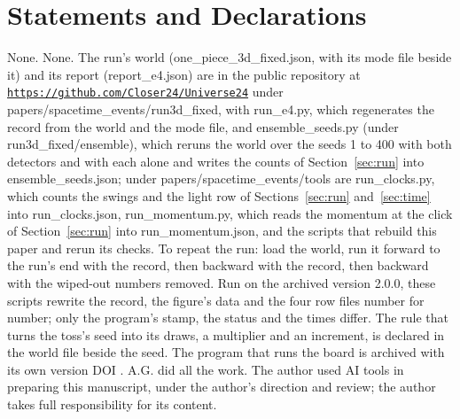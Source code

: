 \documentclass[pdflatex,sn-mathphys-num]{sn-jnl}
\begin{document}
\section*{Statements and Declarations}
 None.
 None.
 The run's world (one\_piece\_3d\_fixed.json, with its mode file beside it) and its report (report\_e4.json) are in the public repository at \href{https://github.com/Closer24/Universe24}{\mbox{\nolinkurl{https://}}\allowbreak\mbox{\nolinkurl{github.com/Closer24/Universe24}}} under papers/spacetime\_events/run3d\_fixed, with \mbox{run\_e4.py}, which regenerates the record from the world and the mode file, and \mbox{ensemble\_seeds.py} (under \mbox{run3d\_fixed/ensemble}), which reruns the world over the seeds 1 to 400 with both detectors and with each alone and writes the counts of Section~\ref{sec:run} into \mbox{ensemble\_seeds.json}; under \mbox{papers/spacetime\_events/tools} are \mbox{run\_clocks.py}, which counts the swings and the light row of Sections~\ref{sec:run} and~\ref{sec:time} into \mbox{run\_clocks.json}, \mbox{run\_momentum.py}, which reads the momentum at the click of Section~\ref{sec:run} into \mbox{run\_momentum.json}, and the scripts that rebuild this paper and rerun its checks. To repeat the run: load the world, run it forward to the run's end with the record, then backward with the record, then backward with the wiped-out numbers removed. Run on the archived version 2.0.0, these scripts rewrite the record, the figure's data and the four row files number for number; only the program's stamp, the status and the times differ. The rule that turns the toss's seed into its draws, a multiplier and an increment, is declared in the world file beside the seed.
 The program that runs the board is archived with its own version DOI \cite{software2}.
 A.G. did all the work.
 The author used AI tools in preparing this manuscript, under the author's direction and review; the author takes full responsibility for its content.

\end{document}
